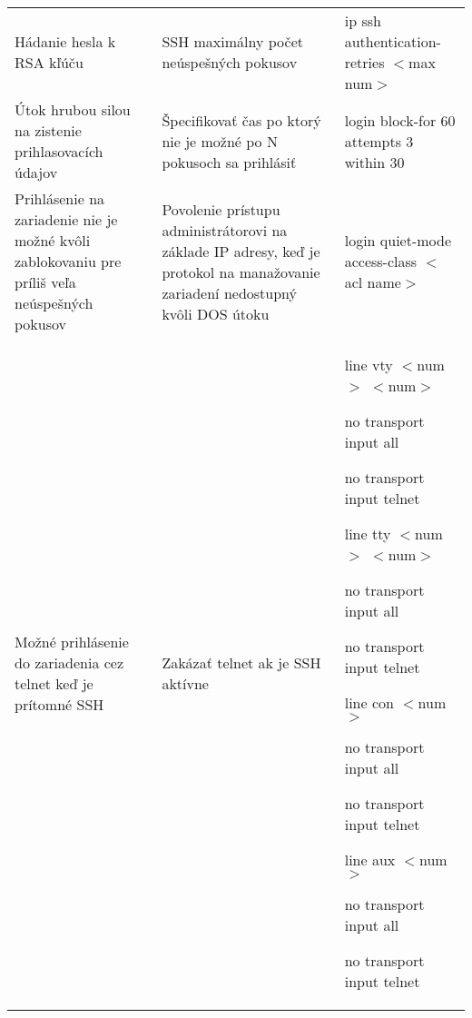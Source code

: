 \begin{longtable}[!htbp]{|L{10em}L{10em}>{\selectfont}L{34em}|}
	
	
	
	Hádanie hesla k RSA kľúču	&SSH maximálny počet neúspešných pokusov	&ip 
	ssh authentication-retries $<$max num$>$\\
	
	
	
	
	Útok hrubou silou na zistenie prihlasovacích údajov	&Špecifikovať čas po ktorý nie je možné po N pokusoch sa prihlásiť	&login block-for 60 attempts 3 within 30\\
	
	
	
	
	 Prihlásenie na zariadenie nie je možné kvôli zablokovaniu pre príliš veľa neúspešných pokusov	&Povolenie prístupu administrátorovi na základe IP adresy, keď je protokol na manažovanie zariadení nedostupný kvôli DOS útoku	&login quiet-mode access-class $<$acl name$>$\\
	
	
	
	Možné prihlásenie do zariadenia cez telnet keď je prítomné SSH	&Zakázať telnet ak je SSH aktívne	&line vty $<$num$>$ $<$num$>$
	
	\hspace{0.5em}no transport input all
	
	\hspace{0.5em}no transport input telnet
	\vspace{0.5em}
	
	line tty $<$num$>$ $<$num$>$
	
	\hspace{0.5em}no transport input all
	
	\hspace{0.5em}no transport input telnet
	\vspace{0.5em}
	
	line con $<$num$>$
	
	\hspace{0.5em}no transport input all
	
	\hspace{0.5em}no transport input telnet
	\vspace{0.5em}
	
	line aux $<$num$>$
	
	\hspace{0.5em}no transport input all
	
	\hspace{0.5em}no transport input telnet\\
	
	
	

\end{longtable}
